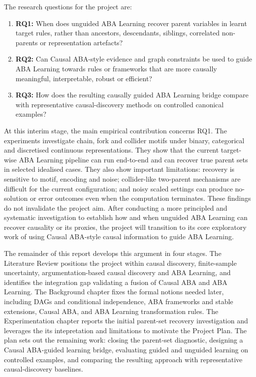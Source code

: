 The research questions for the project are:

\begin{enumerate}
    \item \textbf{RQ1:} When does unguided ABA Learning recover parent variables in learnt target rules, rather than ancestors, descendants, siblings, correlated non-parents or representation artefacts?
    \item \textbf{RQ2:} Can Causal ABA-style evidence and graph constraints be used to guide ABA Learning towards rules or frameworks that are more causally meaningful, interpretable, robust or efficient?
    \item \textbf{RQ3:} How does the resulting causally guided ABA Learning bridge compare with representative causal-discovery methods on controlled canonical examples?
\end{enumerate}

At this interim stage, the main empirical contribution concerns RQ1. The experiments investigate chain, fork and collider motifs under binary, categorical and discretised continuous representations. They show that the current target-wise ABA Learning pipeline can run end-to-end and can recover true parent sets in selected idealised cases. They also show important limitations: recovery is sensitive to motif, encoding and noise; collider-like two-parent mechanisms are difficult for the current configuration; and noisy scaled settings can produce no-solution or error outcomes even when the computation terminates. These findings do not invalidate the project aim. After conducting a more principled and systematic investigation to establish how and when unguided ABA Learning can recover causality or its proxies, the project will transition to its core exploratory work of using Causal ABA-style causal information to guide ABA Learning.

The remainder of this report develops this argument in four stages. The Literature Review positions the project within causal discovery, finite-sample uncertainty, argumentation-based causal discovery and ABA Learning, and identifies the integration gap validating a fusion of Causal ABA and ABA Learning. The Background chapter fixes the formal notions needed later, including DAGs and conditional independence, ABA frameworks and stable extensions, Causal ABA, and ABA Learning transformation rules. The Experimentation chapter reports the initial parent-set recovery investigation and leverages the its intepretation and limitations to motivate the Project Plan. The plan sets out the remaining work: closing the parent-set diagnostic, designing a Causal ABA-guided learning bridge, evaluating guided and unguided learning on controlled examples, and comparing the resulting approach with representative causal-discovery baselines.